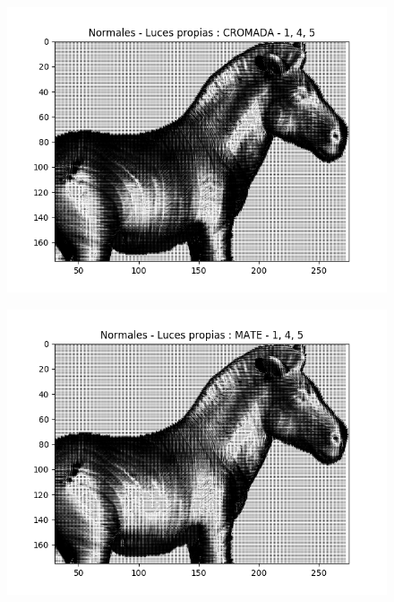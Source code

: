 \begin{figure}[H]
\centering
\begin{minipage}{.5\textwidth}
  \centering
  \includegraphics[width=1\linewidth]{informe/imagenes/normales/normalesLucesPropias145.png}
  \label{fig:test1}
\end{minipage}%
\begin{minipage}{.5\textwidth}
  \centering
  \includegraphics[width=1\linewidth]{informe/imagenes/normales/normalesLucesPropiasMate145.png}
  \label{fig:test2}
\end{minipage}
\end{figure}

